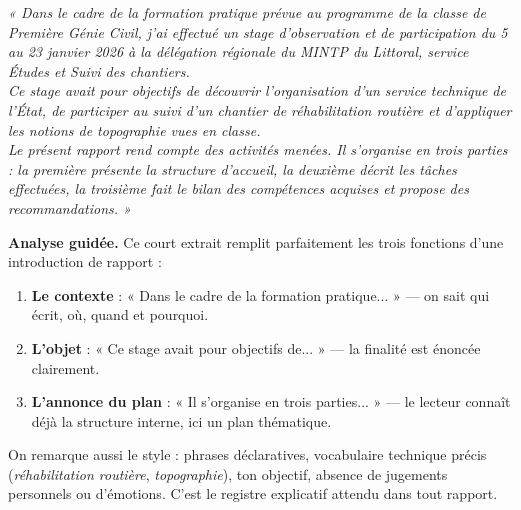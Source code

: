 \documentclass[11pt]{article}
\begin{document}
\begin{exemplebox}
\emph{« Dans le cadre de la formation pratique prévue au programme de la classe de Première Génie Civil, j'ai effectué un stage d'observation et de participation du 5 au 23 janvier 2026 à la délégation régionale du MINTP du Littoral, service Études et Suivi des chantiers.\\
Ce stage avait pour objectifs de découvrir l'organisation d'un service technique de l'État, de participer au suivi d'un chantier de réhabilitation routière et d'appliquer les notions de topographie vues en classe.\\
Le présent rapport rend compte des activités menées. Il s'organise en trois parties : la première présente la structure d'accueil, la deuxième décrit les tâches effectuées, la troisième fait le bilan des compétences acquises et propose des recommandations. »}
\end{exemplebox}

\textbf{Analyse guidée.} Ce court extrait remplit parfaitement les trois fonctions d'une introduction de rapport :

\begin{enumerate}
\item \textbf{Le contexte} : « Dans le cadre de la formation pratique... » — on sait qui écrit, où, quand et pourquoi.
\item \textbf{L'objet} : « Ce stage avait pour objectifs de... » — la finalité est énoncée clairement.
\item \textbf{L'annonce du plan} : « Il s'organise en trois parties... » — le lecteur connaît déjà la structure interne, ici un plan thématique.
\end{enumerate}

On remarque aussi le style : phrases déclaratives, vocabulaire technique précis (\emph{réhabilitation routière}, \emph{topographie}), ton objectif, absence de jugements personnels ou d'émotions. C'est le registre explicatif attendu dans tout rapport.
\end{document}
